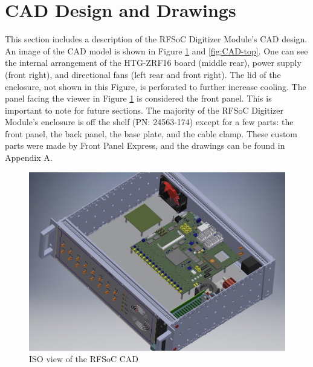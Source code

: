 \documentclass[12pt,a4paper,oneside]{article}
\begin{document}
\section{CAD Design and Drawings}
\label{sec:2}
This section includes a description of the RFSoC Digitizer Module's CAD design. An image of the CAD model is shown in Figure \ref{fig:CAD-Iso} and \ref{fig:CAD-top}. One can see the internal arrangement of the HTG-ZRF16 board (middle rear), power supply (front right), and directional fans (left rear and front right). The lid of the enclosure, not shown in this Figure, is perforated to further increase cooling. The panel facing the viewer in Figure \ref{fig:CAD-Iso} is considered the front panel. This is important to note for future sections. The majority of the RFSoC Digitizer Module's enclosure is off the shelf (PN: 24563-174) except for a few parts: the front panel, the back panel, the base plate, and the cable clamp. These custom parts were made by Front Panel Express, and the drawings can be found in Appendix A. 


%
\begin{figure}[H]
\centering
\includegraphics[width=.9\linewidth]{figures/CAD_iso.jpeg}
\caption{ISO view of the RFSoC CAD}
\label{fig:CAD-Iso}
\end{figure}
%
\end{document}
